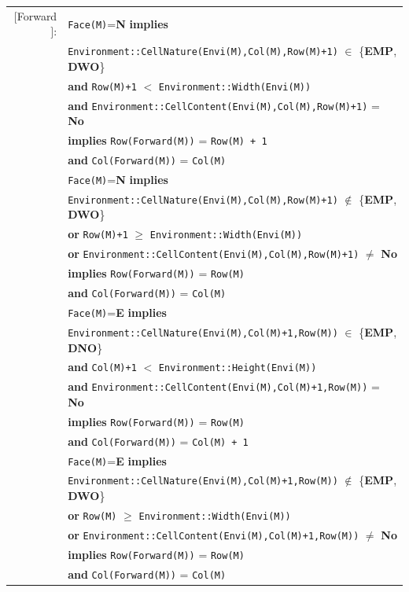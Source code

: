\documentclass[12pt]{report}
\begin{document}
\begin{tabular}{rl}
$[$Forward$]$: & \texttt{Face(M)}=\textbf{N} \textbf{implies} \\
& \texttt{Environment::CellNature(Envi(M),Col(M),Row(M)+1)} $\in$ \{\textbf{EMP}, \textbf{DWO}\} \\
& \textbf{and} \texttt{Row(M)+1} $<$ \texttt{Environment::Width(Envi(M))} \\
& \textbf{and} \texttt{Environment::CellContent(Envi(M),Col(M),Row(M)+1)} = \textbf{No} \\
& \textbf{implies} \texttt{Row(Forward(M))} = \texttt{Row(M) + 1} \\
& \textbf{and} \texttt{Col(Forward(M))} = \texttt{Col(M)} \\
& \texttt{Face(M)}=\textbf{N} \textbf{implies} \\
& \texttt{Environment::CellNature(Envi(M),Col(M),Row(M)+1)} $\notin$ \{\textbf{EMP}, \textbf{DWO}\} \\
& \textbf{or} \texttt{Row(M)+1} $\geq$ \texttt{Environment::Width(Envi(M))} \\
& \textbf{or} \texttt{Environment::CellContent(Envi(M),Col(M),Row(M)+1)} $\neq$ \textbf{No} \\
& \textbf{implies} \texttt{Row(Forward(M))} = \texttt{Row(M)} \\
& \textbf{and} \texttt{Col(Forward(M))} = \texttt{Col(M)} \\
& \texttt{Face(M)}=\textbf{E} \textbf{implies} \\
& \texttt{Environment::CellNature(Envi(M),Col(M)+1,Row(M))} $\in$ \{\textbf{EMP}, \textbf{DNO}\} \\
& \textbf{and} \texttt{Col(M)+1} $<$ \texttt{Environment::Height(Envi(M))} \\
& \textbf{and} \texttt{Environment::CellContent(Envi(M),Col(M)+1,Row(M))} = \textbf{No} \\
& \textbf{implies} \texttt{Row(Forward(M))} = \texttt{Row(M)} \\
& \textbf{and} \texttt{Col(Forward(M))} = \texttt{Col(M) + 1} \\
& \texttt{Face(M)}=\textbf{E} \textbf{implies} \\
& \texttt{Environment::CellNature(Envi(M),Col(M)+1,Row(M))} $\notin$ \{\textbf{EMP}, \textbf{DWO}\} \\
& \textbf{or} \texttt{Row(M)} $\geq$ \texttt{Environment::Width(Envi(M))} \\
& \textbf{or} \texttt{Environment::CellContent(Envi(M),Col(M)+1,Row(M))} $\neq$ \textbf{No} \\
& \textbf{implies} \texttt{Row(Forward(M))} = \texttt{Row(M)} \\
& \textbf{and} \texttt{Col(Forward(M))} = \texttt{Col(M)}

\end{tabular}
\end{document}
